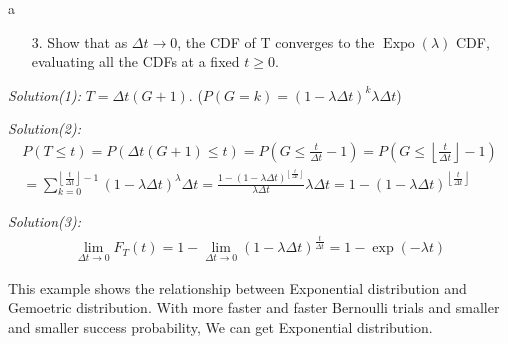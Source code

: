 \documentclass[8pt]{beamer}
\newcommand{\myexp}[1]{\exp{\left(#1\right)}}
\newcommand{\myexpo}[1]{\operatorname{Expo}\!\left(#1\right)}
\begin{document}
 \begin{frame}{a}
    \begin{enumerate}
        \item[3.] Show that as $\Delta t \rightarrow 0$, the CDF of T converges to the $\myexpo{\lambda}$ CDF, evaluating all the CDFs at a fixed $t \geq 0$.
    \end{enumerate}

    \textit{Solution(1):} $T = \Delta t (G+1)$. ($P(G=k) = (1- \lambda \Delta t)^k \lambda \Delta t$)

    \textit{Solution(2):} \[\begin{gathered}
        P(T \leq t) = P(\Delta t (G+1) \leq t) = P(G \leq \frac{t}{\Delta t} -1) = P(G \leq \left\lfloor \frac{t}{\Delta t} \right\rfloor - 1) \\
        = \sum_{k=0}^{\left\lfloor \frac{t}{\Delta t}\right\rfloor - 1} (1-\lambda \Delta t)^ \lambda \Delta t = \frac{1 - (1 - \lambda \Delta t)^{\left\lfloor\frac{t}{\Delta t} \right\rfloor}}{\lambda \Delta t} \lambda \Delta t = 1 - (1-\lambda \Delta t)^{\left\lfloor \frac{t}{\Delta t}\right\rfloor}
    \end{gathered}
    \]

    \textit{Solution(3):}
    \[
    \begin{gathered}
        \lim_{\Delta t \rightarrow 0} F_T(t) = 1 - \lim_{\Delta t \rightarrow 0} (1- \lambda \Delta t)^{\frac{t}{\Delta t}} = 1- \myexp{-\lambda t}
    \end{gathered}
    \]

    This example shows the relationship between Exponential distribution and Gemoetric distribution. With more faster and faster Bernoulli trials and smaller and smaller success probability, We can get Exponential distribution.


 
 \end{frame}
\end{document}
